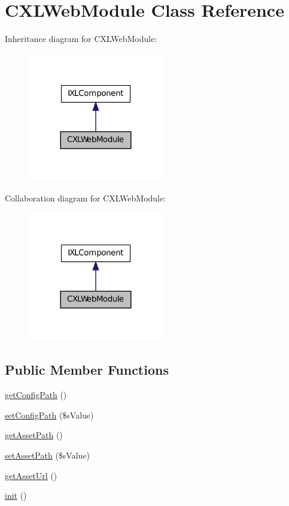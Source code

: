 \hypertarget{classCXLWebModule}{
\section{CXLWebModule Class Reference}
\label{classCXLWebModule}
}


Inheritance diagram for CXLWebModule:\nopagebreak
\begin{figure}[H]
\begin{center}
\leavevmode
\includegraphics[width=168pt]{classCXLWebModule__inherit__graph}
\end{center}
\end{figure}


Collaboration diagram for CXLWebModule:\nopagebreak
\begin{figure}[H]
\begin{center}
\leavevmode
\includegraphics[width=168pt]{classCXLWebModule__coll__graph}
\end{center}
\end{figure}
\subsection*{Public Member Functions}
\begin{DoxyCompactItemize}
\item 
\hyperlink{classCXLWebModule_ae21d2d711f414697477df2a4726e8daf}{getConfigPath} ()
\item 
\hyperlink{classCXLWebModule_a8115b613ae055d17768f138534ac45f3}{setConfigPath} (\$sValue)
\item 
\hyperlink{classCXLWebModule_a5b344fe2f40c0f235b4ede8e1c1ea4a3}{getAssetPath} ()
\item 
\hyperlink{classCXLWebModule_af9acd3d053a814ffec785ab8d9c24d82}{setAssetPath} (\$sValue)
\item 
\hyperlink{classCXLWebModule_a7d8986335d8119f7e20f5b9a4c1f15f7}{getAssetUrl} ()
\item 
\hyperlink{classCXLWebModule_a4be4055f3361d4800e16bc2e2e38cda6}{init} ()
\end{DoxyCompactItemize}
